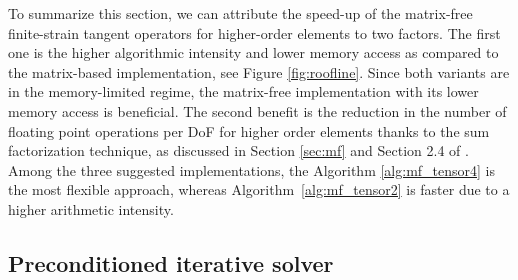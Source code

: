 \documentclass[AMA,STIX1COL]{WileyNJD-v2}
\begin{document}
To summarize this section, we can attribute the speed-up of the matrix-free finite-strain tangent operators for higher-order elements to two factors.
The first one is the higher algorithmic intensity and lower memory access as compared to the matrix-based implementation,
see Figure \ref{fig:roofline}. Since both variants are in the memory-limited regime, the matrix-free implementation with its lower memory access is beneficial.
The second benefit is the reduction in the number of floating point operations per DoF for higher order elements thanks to the sum factorization technique, as discussed in
Section \ref{sec:mf} and Section 2.4 of \cite{kronbichler12}.
Among the three suggested implementations, the Algorithm \ref{alg:mf_tensor4} is the most flexible approach,
whereas Algorithm~\ref{alg:mf_tensor2} is faster due to a higher arithmetic intensity.

\subsection{Preconditioned iterative solver}
\end{document}
